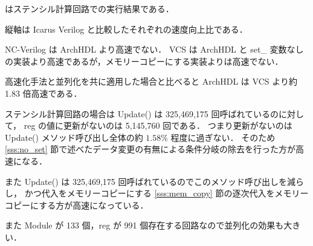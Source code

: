  はステンシル計算回路での実行結果である．

縦軸は Icarus Verilog と比較したそれぞれの速度向上比である．

NC-Verilog は ArchHDL より高速でない．
VCS は ArchHDL と set\_ 変数なしの実装より高速であるが，メモリーコピーにする実装よりは高速でない．

高速化手法と並列化を共に適用した場合と比べると ArchHDL は VCS より約 1.83 倍高速である．

ステンシル計算回路の場合は Update() は 325,469,175 回呼ばれているのに対して，
reg の値に更新がないのは 5,145,760 回である．
つまり更新がないのは Update() メソッド呼び出し全体の約 $1.58\%$ 程度に過ぎない．
そのため \ref{sss:no_set} 節で述べたデータ変更の有無による条件分岐の除去を行った方が高速になる．

また Update() は 325,469,175 回呼ばれているのでこのメソッド呼び出しを減らし，
かつ代入をメモリーコピーにする \ref{sss:mem_copy} 節の逐次代入をメモリーコピーにする方が高速になっている．

また Module が 133 個，reg が 991 個存在する回路なので並列化の効果も大きい．



